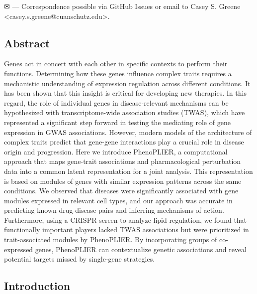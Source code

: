 \documentclass[
  legalpaperpaper,
]{article}
\begin{document}
\leavevmode{}%
✉ --- Correspondence possible via GitHub Issues
or email to
Casey S. Greene \textless casey.s.greene@cuanschutz.edu\textgreater.

\hypertarget{abstract}{%
\subsection{Abstract}\label{abstract}}

Genes act in concert with each other in specific contexts to perform their functions.
Determining how these genes influence complex traits requires a mechanistic understanding of expression regulation across different conditions.
It has been shown that this insight is critical for developing new therapies.
In this regard, the role of individual genes in disease-relevant mechanisms can be hypothesized with transcriptome-wide association studies (TWAS), which have represented a significant step forward in testing the mediating role of gene expression in GWAS associations.
However, modern models of the architecture of complex traits predict that gene-gene interactions play a crucial role in disease origin and progression.
Here we introduce PhenoPLIER, a computational approach that maps gene-trait associations and pharmacological perturbation data into a common latent representation for a joint analysis.
This representation is based on modules of genes with similar expression patterns across the same conditions.
We observed that diseases were significantly associated with gene modules expressed in relevant cell types, and our approach was accurate in predicting known drug-disease pairs and inferring mechanisms of action.
Furthermore, using a CRISPR screen to analyze lipid regulation, we found that functionally important players lacked TWAS associations but were prioritized in trait-associated modules by PhenoPLIER.
By incorporating groups of co-expressed genes, PhenoPLIER can contextualize genetic associations and reveal potential targets missed by single-gene strategies.

\hypertarget{introduction}{%
\subsection{Introduction}\label{introduction}}
\end{document}
